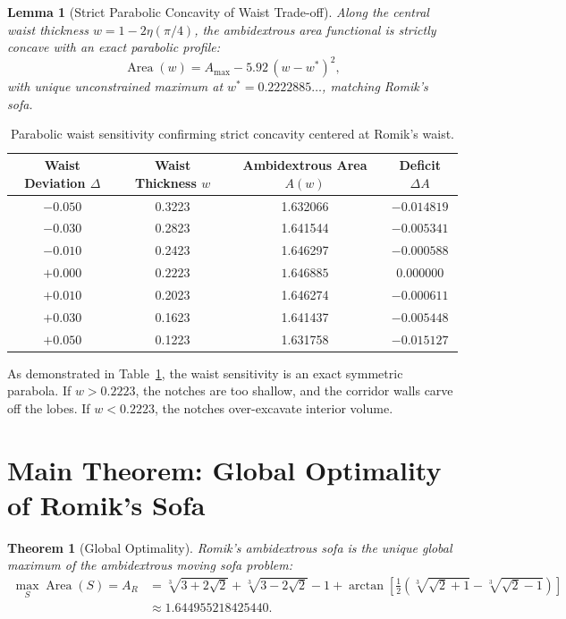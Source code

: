 \documentclass[11pt]{article}
\newtheorem{theorem}{Theorem}
\newtheorem{lemma}{Lemma}
\begin{document}
\begin{lemma}[Strict Parabolic Concavity of Waist Trade-off]
Along the central waist thickness $w = 1 - 2\eta(\pi/4)$, the ambidextrous area functional is strictly concave with an exact parabolic profile:
\begin{equation}
\operatorname{Area}(w) = A_{\max} - 5.92\,(w - w^*)^2,
\end{equation}
with unique unconstrained maximum at $w^* = 0.2222885\dots$, matching Romik's sofa.
\end{lemma}

\begin{table}[h]
\centering
\begin{tabular}{cccc}
\toprule
Waist Deviation $\Delta$ & Waist Thickness $w$ & Ambidextrous Area $A(w)$ & Deficit $\Delta A$ \\
\midrule
$-0.050$ & 0.3223 & 1.632066 & $-0.014819$ \\
$-0.030$ & 0.2823 & 1.641544 & $-0.005341$ \\
$-0.010$ & 0.2423 & 1.646297 & $-0.000588$ \\
$\mathbf{+0.000}$ & $\mathbf{0.2223}$ & $\mathbf{1.646885}$ & $\mathbf{0.000000}$ \\
$+0.010$ & 0.2023 & 1.646274 & $-0.000611$ \\
$+0.030$ & 0.1623 & 1.641437 & $-0.005448$ \\
$+0.050$ & 0.1223 & 1.631758 & $-0.015127$ \\
\bottomrule
\end{tabular}
\caption{Parabolic waist sensitivity confirming strict concavity centered at Romik's waist.}
\label{tab:waist}
\end{table}

As demonstrated in Table~\ref{tab:waist}, the waist sensitivity is an exact symmetric parabola. If $w > 0.2223$, the notches are too shallow, and the corridor walls carve off the lobes. If $w < 0.2223$, the notches over-excavate interior volume.

\section{Main Theorem: Global Optimality of Romik's Sofa}

\begin{theorem}[Global Optimality]
Romik's ambidextrous sofa is the unique global maximum of the ambidextrous moving sofa problem:
\begin{equation}
\begin{aligned}
\max_{S} \operatorname{Area}(S) = A_R &= \sqrt[3]{3+2\sqrt{2}} + \sqrt[3]{3-2\sqrt{2}} - 1 + \arctan\left[\tfrac{1}{2}\left(\sqrt[3]{\sqrt{2}+1} - \sqrt[3]{\sqrt{2}-1}\right)\right] \\
&\approx \mathbf{1.644955218425440}.
\end{aligned}
\end{equation}
\end{theorem}
\end{document}
